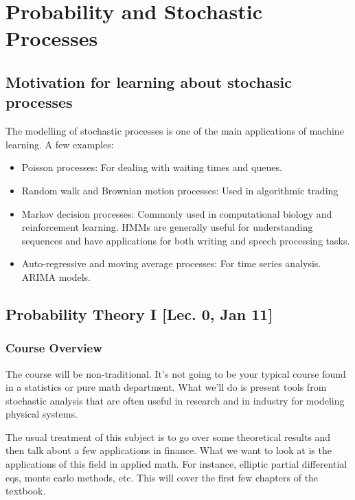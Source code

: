 \chapter{Probability and Stochastic Processes}

\section{Motivation for learning about stochasic processes}

The modelling of stochastic processes is one of the main applications of machine learning. A few examples:
\begin{itemize}
	\item Poisson processes: For dealing with waiting times and queues.
	\item Random walk and Brownian motion processes: Used in algorithmic trading
	\item Markov decision processes: Commonly used in computational biology and reinforcement learning. HMMs are generally useful for understanding sequences and have applications for both writing and speech processing tasks.  
	\item Auto-regressive and moving average processes: For time series analysis. ARIMA models. 
\end{itemize}



\section{Probability Theory I [Lec. 0, Jan 11]}

\subsection{Course Overview}

The course will be non-traditional. It's not going to be your typical course found in a statistics or pure math department. What we'll do is present tools from stochastic analysis that are often useful in research and in industry for modeling physical systems.

The usual treatment of this subject is to go over some theoretical results and then talk about a few applications in finance. What we want to look at is the applications of this field in applied math. For instance, elliptic partial differential eqs, monte carlo methods, etc. This will cover the first few chapters of the textbook.

